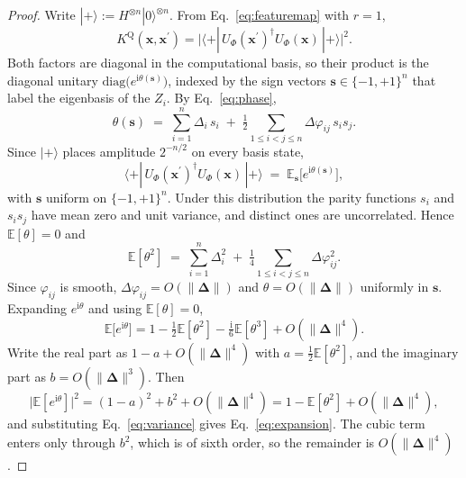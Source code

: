 \begin{proof}
Write $|+\rangle := H^{\otimes n}|0\rangle^{\otimes n}$. From Eq.~\eqref{eq:featuremap} with
$r=1$,
\begin{equation*}
  K^{\mathrm{Q}}(\bm{x},\bm{x}^{\prime})
  = \bigl|\langle +|\,U_{\Phi}(\bm{x}^{\prime})^{\dagger}U_{\Phi}(\bm{x})\,
    |+\rangle\bigr|^{2}.
\end{equation*}
Both factors are diagonal in the computational basis, so their product is the diagonal unitary
$\mathrm{diag}\bigl(e^{\mathrm{i}\theta(\bm{s})}\bigr)$, indexed by the sign vectors
$\bm{s}\in\{-1,+1\}^{n}$ that label the eigenbasis of the $Z_i$. By Eq.~\eqref{eq:phase},
\begin{equation}
\label{eq:theta}
  \theta(\bm{s}) \;=\; \sum_{i=1}^{n}\Delta_i\,s_i
  \;+\; \tfrac{1}{2}\!\!\sum_{1\le i<j\le n}\!\!\Delta\varphi_{ij}\,s_is_j .
\end{equation}
Since $|+\rangle$ places amplitude $2^{-n/2}$ on every basis state,
\begin{equation}
\label{eq:expectation}
  \langle +|\,U_{\Phi}(\bm{x}^{\prime})^{\dagger}U_{\Phi}(\bm{x})\,|+\rangle
  \;=\; \mathbb{E}_{\bm{s}}\bigl[e^{\mathrm{i}\theta(\bm{s})}\bigr],
\end{equation}
with $\bm{s}$ uniform on $\{-1,+1\}^{n}$. Under this distribution the parity functions $s_i$
and $s_is_j$ have mean zero and unit variance, and distinct ones are uncorrelated. Hence
$\mathbb{E}[\theta]=0$ and
\begin{equation}
\label{eq:variance}
  \mathbb{E}[\theta^{2}]
  \;=\; \sum_{i=1}^{n}\Delta_i^{2}
  \;+\; \tfrac{1}{4}\!\!\sum_{1\le i<j\le n}\!\!\Delta\varphi_{ij}^{2}.
\end{equation}
Since $\varphi_{ij}$ is smooth, $\Delta\varphi_{ij}=O(\|\bm{\Delta}\|)$ and
$\theta=O(\|\bm{\Delta}\|)$ uniformly in $\bm{s}$. Expanding $e^{\mathrm{i}\theta}$ and using
$\mathbb{E}[\theta]=0$,
\begin{equation*}
  \mathbb{E}\bigl[e^{\mathrm{i}\theta}\bigr]
  = 1 - \tfrac{1}{2}\mathbb{E}[\theta^{2}]
    - \tfrac{\mathrm{i}}{6}\mathbb{E}[\theta^{3}] + O(\|\bm{\Delta}\|^{4}).
\end{equation*}
Write the real part as $1-a+O(\|\bm{\Delta}\|^{4})$ with $a=\tfrac{1}{2}\mathbb{E}[\theta^{2}]$,
and the imaginary part as $b=O(\|\bm{\Delta}\|^{3})$. Then
\begin{equation*}
  \bigl|\mathbb{E}[e^{\mathrm{i}\theta}]\bigr|^{2}
  = (1-a)^{2}+b^{2}+O(\|\bm{\Delta}\|^{4})
  = 1 - \mathbb{E}[\theta^{2}] + O(\|\bm{\Delta}\|^{4}),
\end{equation*}
and substituting Eq.~\eqref{eq:variance} gives Eq.~\eqref{eq:expansion}. The cubic term enters
only through $b^{2}$, which is of sixth order, so the remainder is $O(\|\bm{\Delta}\|^{4})$.
\end{proof}

